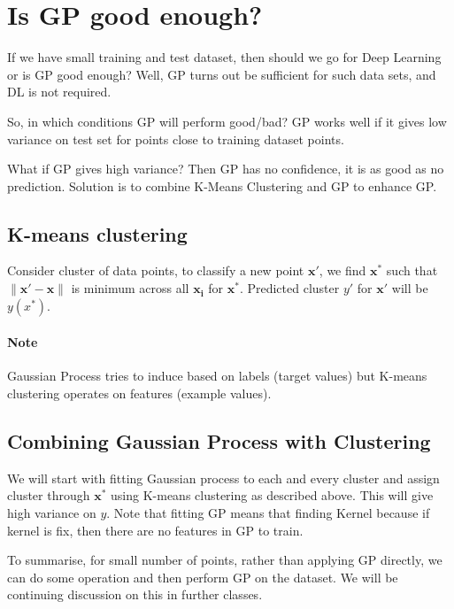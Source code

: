 \documentclass[12pt]{article}
\begin{document}
\section{Is GP good enough?}

If we have small training and test dataset, then should we go for Deep Learning or is GP good enough? Well, GP turns out be sufficient for such data sets, and DL is not required. 

So, in which conditions GP will perform good/bad? GP works well if it gives low variance on test set for points close to training dataset points.

What if GP gives high variance? Then GP has no confidence, it is as good as no prediction. Solution is to combine K-Means Clustering and GP to enhance GP.

\subsection{K-means clustering}
Consider cluster of data points, to classify a new point $\mathbf{x'}$, we find $\mathbf{x^*}$ such that $\|\mathbf{x'-x}\|$ is minimum across all $\mathbf{x_i}$ for $\mathbf{x^*}$. Predicted cluster $y'$ for $\mathbf{x'}$ will be $y(x^*)$.
\paragraph{Note} Gaussian Process tries to induce based on labels (target values) but K-means clustering operates on features (example values).

\subsection{Combining Gaussian Process with Clustering }
We will start with fitting Gaussian process to each and every cluster and assign cluster through $\mathbf{x^*}$ using K-means clustering as described above. This will give high variance on $y$. Note that fitting GP means that finding Kernel because if kernel is fix, then there are no features in GP to train. 

To summarise, for small number of points, rather than applying GP directly, we can do some operation and then perform GP on the dataset. We will be continuing discussion on this in further classes. 
\newpage
          
              
\end{document}
